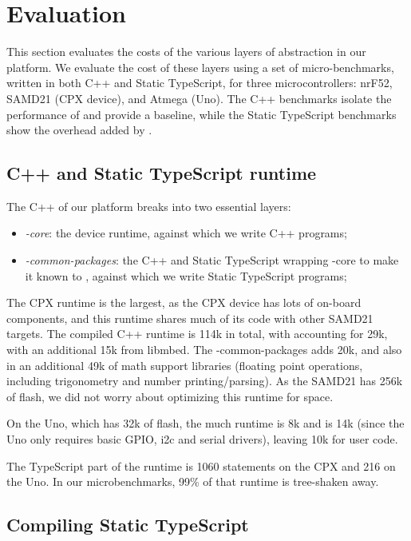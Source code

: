 \section{Evaluation}
\label{sec:evaluate}

This section evaluates the costs of the various layers of abstraction in our platform.
We evaluate the cost of these layers using a set of micro-benchmarks, written
in both C++ and Static TypeScript, for three microcontrollers: nrF52, 
SAMD21 (CPX device), and Atmega (Uno). The C++ benchmarks isolate the performance
of \CO and provide a baseline, while the Static TypeScript benchmarks show the overhead
added by \MC. 

\subsection{C++ and Static TypeScript runtime}
The C++ of our platform breaks into two essential layers:
\begin{itemize}
\item \emph{\CON-core}: the \CO device runtime, against which we write C++ programs;
\item \emph{\MCN-common-packages}: the C++ and Static TypeScript wrapping \CON-core 
to make it known to \MC, against which we write Static TypeScript programs;
\end{itemize}

The CPX runtime is the largest, as the CPX device has lots of on-board
components, and this runtime shares much of its code with other SAMD21 \MC targets.
The compiled C++ runtime is 114k in total, with \CO accounting for 29k, with an
additional 15k from libmbed. The \MCN-common-packages adds 20k, and also in
an additional 49k of math support libraries (floating point operations,
including trigonometry and number printing/parsing).
As the SAMD21 has 256k of flash, we did not worry about optimizing this runtime for space.

On the Uno, which has 32k of flash, the much \MC runtime is 8k and \CO is 14k (since
the Uno only requires basic GPIO, i2c and serial drivers), leaving 10k for user code. 

The TypeScript part of the runtime is 1060 statements on the CPX and 216 on the Uno.
In our microbenchmarks, 99\% of that runtime is tree-shaken away.

\subsection{Compiling Static TypeScript}

